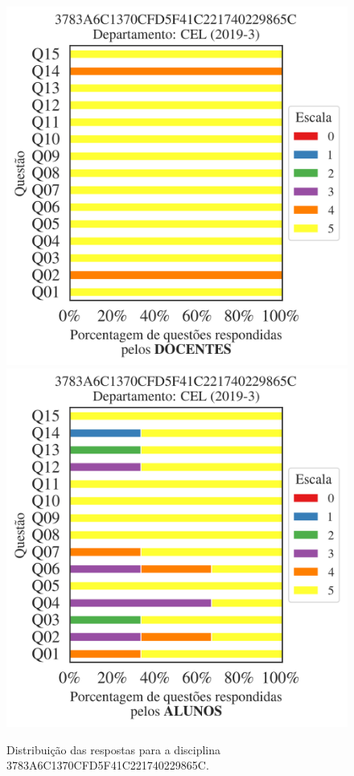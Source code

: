 \documentclass[a4paper,10pt]{article}
\begin{document}
\begin{figure}[h]
\centering
\includegraphics[width=0.485\linewidth]{analise_disciplina_departamento_CEL_3783A6C1370CFD5F41C221740229865C_docentes.png}
\includegraphics[width=0.485\linewidth]{analise_disciplina_departamento_CEL_3783A6C1370CFD5F41C221740229865C_alunos.png}
\caption{\label{fig:analise_geral_departamento}                Distribuição das respostas para a disciplina 3783A6C1370CFD5F41C221740229865C. }
\end{figure}
\end{document}
